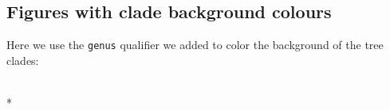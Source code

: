 \documentclass[letterpaper,10pt,english]{/usr/share/sphinx/texinputs/sphinxhowto}
\def\smaller{\fontsize{9.5pt}{9.5pt}\selectfont}
\begin{document}
        
    
\subsection{Figures with clade background
colours}\label{figures-with-clade-background-colours}

Here we use the \texttt{genus} qualifier we added to color the
background of the tree clades:


    
        \vspace{6pt}
        \makebox[0.1\linewidth]{\smaller\hfill\tt\color{nbframe-in-prompt}In\hspace{4pt}{[}43{]}:\hspace{4pt}}\\*
        \vspace{-2.65\baselineskip}
\end{document}
